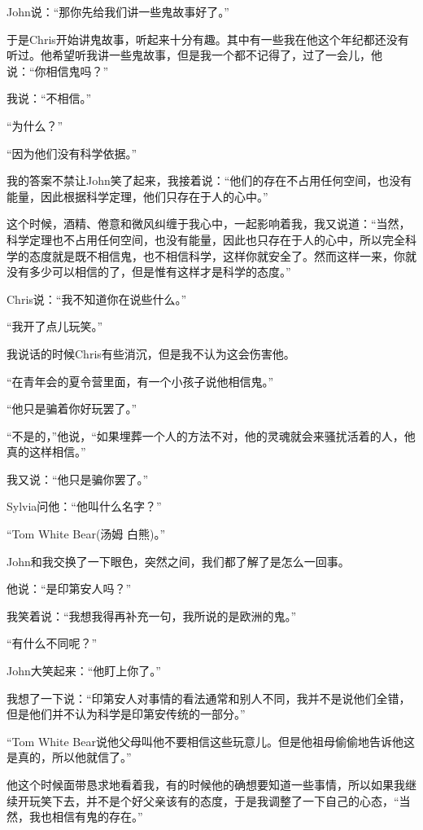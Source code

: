 \documentclass[UTF8]{article}
\begin{document}
\par John说：“那你先给我们讲一些鬼故事好了。”
\par 于是Chris开始讲鬼故事，听起来十分有趣。其中有一些我在他这个年纪都还没有听过。他希望听我讲一些鬼故事，但是我一个都不记得了，过了一会儿，他说：“你相信鬼吗？”
\par 我说：“不相信。”
\par “为什么？”
\par “因为他们没有科学依据。”
\par 我的答案不禁让John笑了起来，我接着说：“他们的存在不占用任何空间，也没有能量，因此根据科学定理，他们只存在于人的心中。”
\par 这个时候，酒精、倦意和微风纠缠于我心中，一起影响着我，我又说道：“当然，科学定理也不占用任何空间，也没有能量，因此也只存在于人的心中，所以完全科学的态度就是既不相信鬼，也不相信科学，这样你就安全了。然而这样一来，你就没有多少可以相信的了，但是惟有这样才是科学的态度。”
\par Chris说：“我不知道你在说些什么。”
\par “我开了点儿玩笑。”
\par 我说话的时候Chris有些消沉，但是我不认为这会伤害他。
\par “在青年会的夏令营里面，有一个小孩子说他相信鬼。”
\par “他只是骗着你好玩罢了。”
\par “不是的，”他说，“如果埋葬一个人的方法不对，他的灵魂就会来骚扰活着的人，他真的这样相信。”
\par 我又说：“他只是骗你罢了。”
\par Sylvia问他：“他叫什么名字？”
\par “Tom White Bear(汤姆 白熊)。”
\par John和我交换了一下眼色，突然之间，我们都了解了是怎么一回事。
\par 他说：“是印第安人吗？”
\par 我笑着说：“我想我得再补充一句，我所说的是欧洲的鬼。”
\par “有什么不同呢？”
\par John大笑起来：“他盯上你了。”
\par 我想了一下说：“印第安人对事情的看法通常和别人不同，我并不是说他们全错，但是他们并不认为科学是印第安传统的一部分。”
\par “Tom White Bear说他父母叫他不要相信这些玩意儿。但是他祖母偷偷地告诉他这是真的，所以他就信了。”
\par 他这个时候面带恳求地看着我，有的时候他的确想要知道一些事情，所以如果我继续开玩笑下去，并不是个好父亲该有的态度，于是我调整了一下自己的心态，“当然，我也相信有鬼的存在。”
\end{document}
